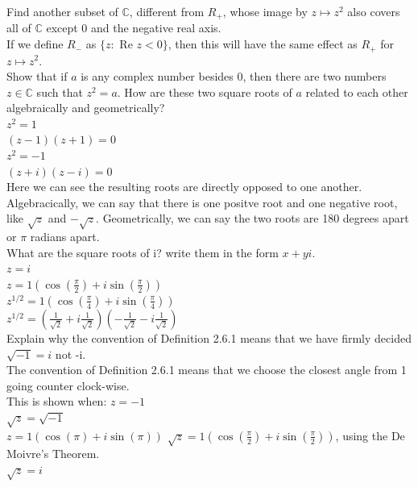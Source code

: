\documentclass[12pt]{article}
\begin{document}
 Find another subset of $\mathbb{C}$, different from $R_+$, whose image by $z \mapsto z^2$ also covers all of $\mathbb{C}$ except 0 and the negative real axis.\\

If we define $R_-$ as $\{z : $ Re $ z < 0\}$, then this will have the same effect as $R_+$ for $z \mapsto z^2$.\\



 Show that if $a$ is any complex number besides 0, then there are two numbers $z \in \mathbb{C}$ such that $z^2 = a$.  How are these two square roots of $a$ related to each other algebraically and geometrically?\\

$z^2 = 1$\\
$(z-1)(z+1) = 0$\\

$z^2 = -1$\\
$(z + i)(z - i) = 0$\\

Here we can see the resulting roots are directly opposed to one another. 
Algebracically, we can say that there is one positve root and one negative root, like $\sqrt{z}$ and $-\sqrt{z}$.
Geometrically, we can say the two roots are 180 degrees apart or $\pi$ radians apart.\\



What are the square roots of i? write them in the form $x + yi$.\\

$z = i$\\
$z = 1(\cos(\frac{\pi}{2}) + i\sin(\frac{\pi}{2}))$\\
$z^{1/2} = 1(\cos(\frac{\pi}{4}) + i\sin(\frac{\pi}{4}))$\\
$z^{1/2} = (\frac{1}{\sqrt{2}} + i\frac{1}{\sqrt{2}})(-\frac{1}{\sqrt{2}} - i\frac{1}{\sqrt{2}})$\\


Explain why the convention of Definition 2.6.1 means that we have firmly decided $\sqrt{-1} = i$ not -i.\\

The convention of Definition 2.6.1 means that we choose the closest angle from 1 going counter clock-wise.\\

This is shown when: $z = -1$\\
$\sqrt{z} = \sqrt{-1}$\\
$z = 1(\cos(\pi) + i\sin(\pi))$
$\sqrt{z} = 1(\cos(\frac{\pi}{2}) + i\sin(\frac{\pi}{2}))$, using the De Moivre's Theorem.\\
$\sqrt{z} = i$\\
\end{document}
